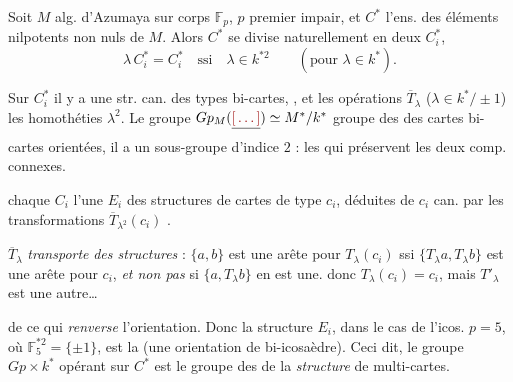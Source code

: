 \documentclass[11pt,a4paper]{article}
\begin{document}
Soit $M$ alg. d'Azumaya sur corps $\mathbb{F}_p$, $p$ premier impair, et $C^*$ l'ens. des éléments nilpotents non nuls de $M$.
Alors \struck{\ill{}} $C^*$ se divise naturellement en deux $C^*_i$, \struck{\ill{}}
\[
  \lambda\, C^*_i = C^*_i \quad\text{ssi}\quad \lambda \in k^{*2} \qquad (\text{pour } \lambda\in k^*) .
\]

Sur $C^*_i$ il y a une str. can. des types   bi-cartes, , et les opérations $\overline{T}_\lambda$ ($\lambda\in k^*/\pm 1$)  les homothéties $\lambda^2$. Le groupe $Gp_M(\struck{\ill{}}) \simeq M^*/k^*$   groupe des \ill{} des cartes bi-cartes orientées, il a un sous-groupe d'indice $2$ : les  qui préservent les deux comp. connexes. 

  chaque $C_i$ l'une $E_i$  des structures de cartes de type $c_i$, déduites de $c_i$ can. par les transformations $\overline{T}_{\lambda^2}(c_i)$ .

$\overline{T}_\lambda$ \emph{transporte} \emph{des structures} : \struck{\ill{}} 
$\{a,b\}$ est une arête pour $T_\lambda(c_i)$ ssi $\{T_\lambda a, T_\lambda b\}$  est une arête pour $c_i$, \emph{et non pas} si $\{a, T_\lambda b\}$ en est une. \struck{\ill{} \ill{} \ill{}}  donc $T_\lambda(c_i) = c_i$, mais $T'_\lambda$ est une autre…


de ce qui \emph{renverse} l'orientation. 
Donc la structure $E_i$, dans le cas de l'icos. $p=5$, où $\mathbb{F}_5^{*2} = \{\pm 1\}$, est la  (une orientation de bi-icosaèdre). Ceci dit, le groupe $Gp\times k^*$ opérant sur $C^*$ est le groupe des  de la \emph{structure} de multi-cartes.
\end{document}
